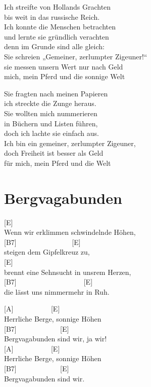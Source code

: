 \documentclass[
  letterpaper,
  twoside=false]{scrbook}
\begin{document}
Ich streifte von Hollands Grachten\\
bis weit in das russische Reich.\\
Ich konnte die Menschen betrachten\\
und lernte sie gründlich verachten\\
denn im Grunde sind alle gleich:\\
Sie schreien „Gemeiner, zerlumpter Zigeuner!{}``\\
sie messen unsern Wert nur nach Geld\\
mich, mein Pferd und die sonnige Welt

Sie fragten nach meinen Papieren\\
ich streckte die Zunge heraus.\\
Sie wollten mich nummerieren\\
in Büchern und Listen führen,\\
doch ich lachte sie einfach aus.\\
Ich bin ein gemeiner, zerlumpter Zigeuner,\\
doch Freiheit ist besser als Geld\\
für mich, mein Pferd und die Welt

\hypertarget{bergvagabunden}{%
\chapter{Bergvagabunden}\label{bergvagabunden}}

{[}E{]}\\
Wenn wir erklimmen schwindelnde Höhen,\\
{[}B7{]} ~ ~ ~ ~ ~ ~ ~ ~ ~ {[}E{]}\\
steigen dem Gipfelkreuz zu,\\
{[}E{]}\\
brennt eine Sehnsucht in uns\textquotesingle rem Herzen,\\
{[}B7{]} ~ ~ ~ ~ ~ ~ ~ ~ ~ ~ ~ {[}E{]}\\
die lässt uns nimmermehr in Ruh.

{[}A{]} ~ ~ ~ ~ ~ ~ {[}E{]}\\
Herrliche Berge, sonnige Höhen\\
{[}B7{]} ~ ~ ~ ~ ~ ~ ~ {[}E{]}\\
Bergvagabunden sind wir, ja wir!\\
{[}A{]} ~ ~ ~ ~ ~ ~ {[}E{]}\\
Herrliche Berge, sonnige Höhen\\
{[}B7{]} ~ ~ ~ ~ ~ ~ ~ {[}E{]}\\
Bergvagabunden sind wir.
\end{document}
